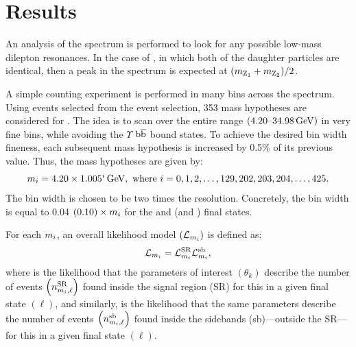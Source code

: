 \section{Results}
\label{sec:results_dilep}
An analysis of the \mZtwo spectrum is performed to look for any possible low-mass dilepton resonances.
In the case of \htozdzd, in which both of the daughter particles are identical, then a peak in the \mZtwo spectrum is expected at $(m_{\mathrm{Z}_{\mathrm{1}}} + m_{\mathrm{Z}_{\mathrm{2}}}) / 2$.

A simple counting experiment is performed in many bins across the \mZtwo spectrum.
Using events selected from the \zzd event selection, 353 mass hypotheses  are considered for \mZtwo.
The idea is to scan over the entire \mZtwo range $(4.20\text{--}34.98 \,\text{Ge\hspace{-.08em}V})$ in very fine \mZtwo bins, while avoiding the $\Upsilon$ $\mathrm{b} \overline{\mathrm{b}}$ bound states.  %
To achieve the desired bin width fineness, each subsequent mass hypothesis is increased by 0.5\% of its previous value.
Thus, the mass hypotheses are given by:
\begin{align*}
    m_{i} = 4.20 \times 1.005^{i} \,\text{Ge\hspace{-.08em}V},
    \text{ where } i = 0,1,2, \ldots, 129, 202, 203, 204, \ldots, 425.
\end{align*}
The bin width is chosen to be two times the \mZtwo resolution.
Concretely, the bin width is equal to 0.04 $(0.10) \times m_{i}$ for the \fourmu and \twoetwomu (\foure and \twomutwoe) final states.

For each $m_{i}$, an overall likelihood model $(\mathcal{L}_{m_{i}})$ is defined as:
\begin{equation*}
    \lhoodm =
    \lhoodSR %
    \lhoodsb, %
\end{equation*}
where \lhoodSR is the likelihood that the parameters of interest $\left( \theta_k \right)$ describe the number of events $\left( n^\text{SR}_{m_{i}, \ell} \right)$ found inside the signal region (SR) for this  in a given final state $(\ell)$,
and similarly, \lhoodsb is the likelihood that the same parameters describe the number of events $\left( n^\text{sb}_{m_{i}, \ell} \right)$ found inside the sidebands (sb)---\ie outside the SR---for this  in a given final state $(\ell)$.

